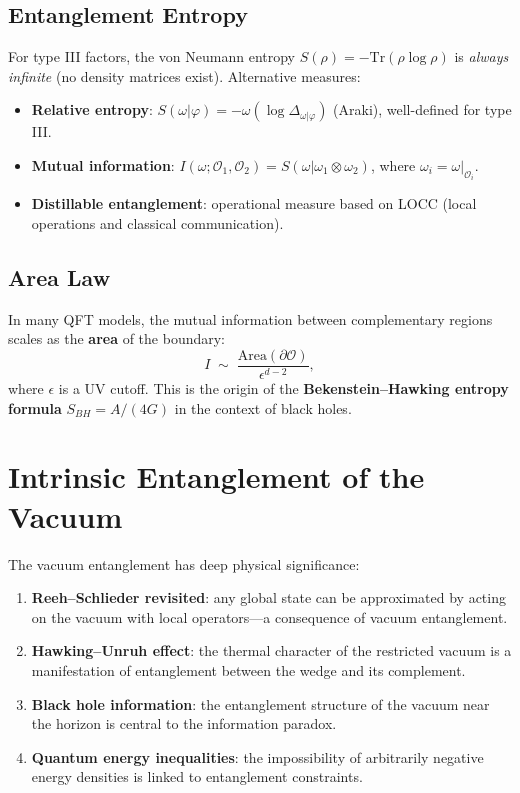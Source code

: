 \documentclass[11pt,a4paper]{article}
\begin{document}
\subsection{Entanglement Entropy}

For type III factors, the von Neumann entropy $S(\rho) = -\mathrm{Tr}(\rho\log\rho)$
is \emph{always infinite} (no density matrices exist). Alternative measures:
\begin{itemize}[nosep]
  \item \textbf{Relative entropy}: $S(\omega|\varphi) = -\omega(\log\Delta_{\omega|\varphi})$
        (Araki), well-defined for type III.
  \item \textbf{Mutual information}: $I(\omega; \mathcal{O}_1, \mathcal{O}_2)
        = S(\omega|\omega_1 \otimes \omega_2)$, where $\omega_i = \omega|_{\mathcal{O}_i}$.
  \item \textbf{Distillable entanglement}: operational measure based on
        LOCC (local operations and classical communication).
\end{itemize}

\subsection{Area Law}

In many QFT models, the mutual information between complementary regions
scales as the \textbf{area} of the boundary:
\begin{equation}
  I \;\sim\; \frac{\mathrm{Area}(\partial\mathcal{O})}{\epsilon^{d-2}},
\end{equation}
where $\epsilon$ is a UV cutoff. This is the origin of the
\textbf{Bekenstein--Hawking entropy formula} $S_{BH} = A/(4G)$
in the context of black holes.

\section{Intrinsic Entanglement of the Vacuum}

The vacuum entanglement has deep physical significance:
\begin{enumerate}[nosep]
  \item \textbf{Reeh--Schlieder revisited}: any global state can be
        approximated by acting on the vacuum with local operators---a
        consequence of vacuum entanglement.
  \item \textbf{Hawking--Unruh effect}: the thermal character of the
        restricted vacuum is a manifestation of entanglement between
        the wedge and its complement.
  \item \textbf{Black hole information}: the entanglement structure of
        the vacuum near the horizon is central to the information paradox.
  \item \textbf{Quantum energy inequalities}: the impossibility of
        arbitrarily negative energy densities is linked to entanglement
        constraints.
\end{enumerate}
\end{document}

